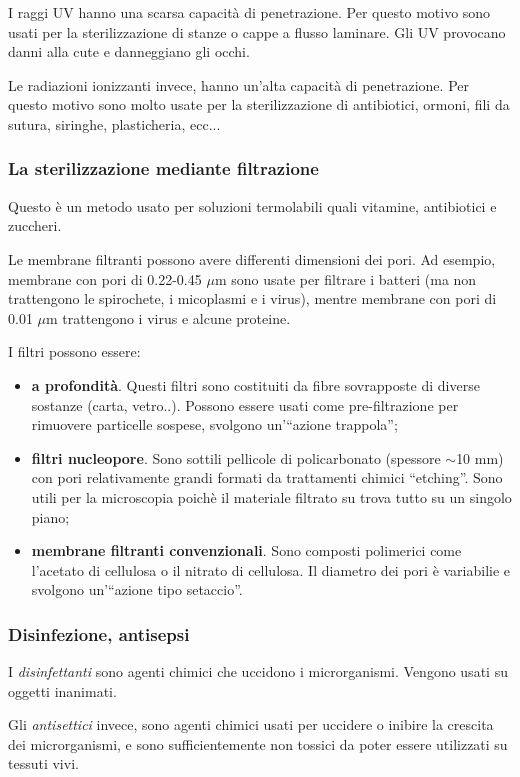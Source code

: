 \documentclass[11pt]{book}
\begin{document}
I raggi UV hanno una scarsa capacità di penetrazione. Per questo motivo sono usati per la sterilizzazione  di stanze o cappe a flusso laminare. 
Gli UV provocano danni alla cute e danneggiano gli occhi.

Le radiazioni ionizzanti invece, hanno un'alta capacità di penetrazione. Per questo motivo sono molto usate per la sterilizzazione di antibiotici, ormoni, fili da sutura, siringhe, plasticheria, ecc...


\subsubsection{La sterilizzazione mediante filtrazione}
Questo è un metodo usato per soluzioni termolabili quali vitamine, antibiotici e zuccheri. 

Le membrane filtranti possono avere differenti dimensioni dei pori. Ad esempio, membrane con pori di 0.22-0.45 $\mu$m sono usate per filtrare i batteri (ma non trattengono le spirochete, i micoplasmi e i virus), mentre membrane con pori di 0.01 $\mu$m trattengono i virus e alcune proteine.

I filtri possono essere:
\begin{itemize}
\item \textbf{a profondità}. Questi filtri sono costituiti da fibre sovrapposte di diverse sostanze (carta, vetro..). Possono essere usati come pre-filtrazione per rimuovere particelle sospese, svolgono un'``azione trappola'';
\item \textbf{filtri nucleopore}. Sono sottili pellicole di policarbonato (spessore $\sim$10 mm) con pori relativamente grandi formati da trattamenti chimici “etching”. Sono utili per la microscopia poichè il materiale filtrato su trova tutto su un singolo piano;
\item \textbf{membrane filtranti convenzionali}. Sono composti polimerici come l'acetato di cellulosa o il nitrato di cellulosa. Il diametro dei pori è variabilie e svolgono un'``azione tipo setaccio''.
\end{itemize}

\clearpage
\subsubsection{Disinfezione, antisepsi}
I \emph{disinfettanti} sono agenti chimici che uccidono i microrganismi. Vengono usati su oggetti inanimati.

Gli \emph{antisettici} invece, sono agenti chimici usati per uccidere o inibire la crescita dei microrganismi, e sono sufficientemente non tossici da poter essere utilizzati su tessuti vivi.
\end{document}

